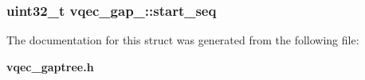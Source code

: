 \subsubsection{\setlength{\rightskip}{0pt plus 5cm}uint32\_\-t \bf{vqec\_\-gap\_\-::start\_\-seq}}\label{structvqec__gap___d858eae1c4a85627fe1ac6900278450a}




The documentation for this struct was generated from the following file:\begin{CompactItemize}
\item 
\bf{vqec\_\-gaptree.h}\end{CompactItemize}
